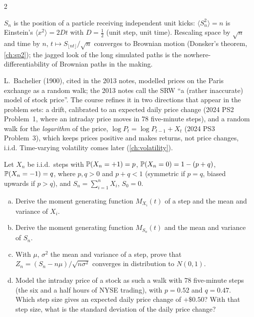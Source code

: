 \begin{paracol}{2}
\begin{intuition}[Diffusion]
$S_n$ is the position of a particle receiving independent unit kicks: $\langle S_n^2\rangle=n$ is
Einstein's $\langle x^2\rangle=2Dt$ with $D=\tfrac12$ (unit step, unit time). Rescaling space by
$\sqrt n$ and time by $n$, $t\mapsto S_{\lfloor nt\rfloor}/\sqrt n$ converges to Brownian motion
(Donsker's theorem, \cref{ch:sp2}); the jagged look of the long simulated paths is the nowhere-differentiability
of Brownian paths in the making.
\end{intuition}

\begin{finance}
L.~Bachelier (1900), cited in the 2013 notes, modelled prices on the Paris exchange as a random walk;
the 2013 notes call the SRW ``a (rather inaccurate) model of stock price''. The course refines it in
two directions that appear in the problem sets: a drift, calibrated to an expected daily price change
(2024 PS2 Problem~1, where an intraday price moves in 78 five-minute steps), and a random walk for
the \emph{logarithm} of the price, $\log P_t=\log P_{t-1}+X_t$ (2024 PS3 Problem~3), which keeps prices
positive and makes returns, not price changes, i.i.d. Time-varying volatility comes later
(\cref{ch:volatility}).
\end{finance}

\begin{exercise}\label{ch04:ex-ps2-1}
Let $X_n$ be i.i.d.\ steps with $\mathbb{P}(X_n=+1)=p$, $\mathbb{P}(X_n=0)=1-(p+q)$, $\mathbb{P}(X_n=-1)=q$, where $p,q>0$ and $p+q<1$
(symmetric if $p=q$, biased upwards if $p>q$), and $S_n=\sum_{i=1}^nX_i$, $S_0=0$.
\begin{enumerate}[(a)]
  \item Derive the moment generating function $M_{X_i}(t)$ of a step and the mean and variance of $X_i$.
  \item Derive the moment generating function $M_{S_n}(t)$ and the mean and variance of $S_n$.
  \item With $\mu$, $\sigma^2$ the mean and variance of a step, prove that $Z_n=(S_n-n\mu)/\sqrt{n\sigma^2}$ converges in
      distribution to $N(0,1)$.
  \item Model the intraday price of a stock as such a walk with 78 five-minute steps (the six and a half hours of NYSE
      trading), with $p=0.52$ and $q=0.47$. Which step size gives an expected daily price change of $+\$0.50$? With that
      step size, what is the standard deviation of the daily price change?
\end{enumerate}
\end{exercise}


\end{paracol}
